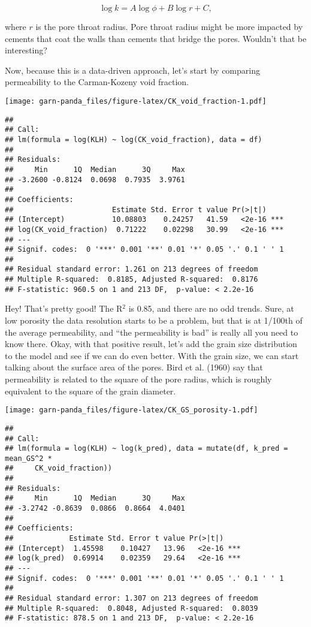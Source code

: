 \documentclass[]{article}
\begin{document}
\begin{equation}
\log k = A \log \phi + B \log r + C,
\end{equation}

where \(r\) is the pore throat radius. Pore throat radius might be more
impacted by cements that coat the walls than cements that bridge the
pores. Wouldn't that be interesting?

Now, because this is a data-driven approach, let's start by comparing
permeability to the Carman-Kozeny void fraction.

\texttt{[image: garn-panda\_files/figure-latex/CK\_void\_fraction-1.pdf]}

\begin{verbatim}
## 
## Call:
## lm(formula = log(KLH) ~ log(CK_void_fraction), data = df)
## 
## Residuals:
##     Min      1Q  Median      3Q     Max 
## -3.2600 -0.8124  0.0698  0.7935  3.9761 
## 
## Coefficients:
##                       Estimate Std. Error t value Pr(>|t|)    
## (Intercept)           10.08803    0.24257   41.59   <2e-16 ***
## log(CK_void_fraction)  0.71222    0.02298   30.99   <2e-16 ***
## ---
## Signif. codes:  0 '***' 0.001 '**' 0.01 '*' 0.05 '.' 0.1 ' ' 1
## 
## Residual standard error: 1.261 on 213 degrees of freedom
## Multiple R-squared:  0.8185, Adjusted R-squared:  0.8176 
## F-statistic: 960.5 on 1 and 213 DF,  p-value: < 2.2e-16
\end{verbatim}

Hey! That's pretty good! The R\(^2\) is 0.85, and there are no odd
trends. Sure, at low porosity the data resolution starts to be a
problem, but that is at 1/100th of the average permeability, and ``the
permeability is bad'' is really all you need to know there. Okay, with
that positive result, let's add the grain size distribution to the model
and see if we can do even better. With the grain size, we can start
talking about the surface area of the pores. Bird et al. (1960) say that
permeability is related to the square of the pore radius, which is
roughly equivalent to the square of the grain diameter.

\texttt{[image: garn-panda\_files/figure-latex/CK\_GS\_porosity-1.pdf]}

\begin{verbatim}
## 
## Call:
## lm(formula = log(KLH) ~ log(k_pred), data = mutate(df, k_pred = mean_GS^2 * 
##     CK_void_fraction))
## 
## Residuals:
##     Min      1Q  Median      3Q     Max 
## -3.2742 -0.8639  0.0866  0.8664  4.0401 
## 
## Coefficients:
##             Estimate Std. Error t value Pr(>|t|)    
## (Intercept)  1.45598    0.10427   13.96   <2e-16 ***
## log(k_pred)  0.69914    0.02359   29.64   <2e-16 ***
## ---
## Signif. codes:  0 '***' 0.001 '**' 0.01 '*' 0.05 '.' 0.1 ' ' 1
## 
## Residual standard error: 1.307 on 213 degrees of freedom
## Multiple R-squared:  0.8048, Adjusted R-squared:  0.8039 
## F-statistic: 878.5 on 1 and 213 DF,  p-value: < 2.2e-16
\end{verbatim}
\end{document}
